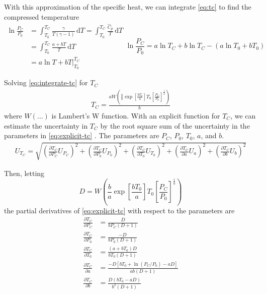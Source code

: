 \documentclass[12pt, letterpaper]{article}
\begin{document}
With this approximation of the specific heat, we can integrate \autoref{eq:tc}
to find the compressed temperature
%
\begin{subequations}
\begin{align}
\ln{\frac{P_C}{P_0}} &= \int_{T_0}^{T_{C}} \! \frac{\gamma}{T\left(\gamma-1\right)} \, \mathrm{d} T
                      = \int_{T_0}^{T_{C}} \! \frac{\hat{C}_p}{T} \, \mathrm{d} T \\
&= \int_{T_0}^{T_{C}} \! \frac{a + b T}{T} \, \mathrm{d} T\\
&= a \ln{T} + b T \Big|_{T_0}^{T_C}
\end{align}
\begin{equation}
\ln{\frac{P_C}{P_0}} = a \ln{T_C} + b \ln{T_C} - \left(a \ln{T_0} + b T_0\right) \label{eq:integrate-tc}
\end{equation}
\end{subequations}

Solving \autoref{eq:integrate-tc} for $T_C$
%
\begin{align}
\label{eq:explicit-tc}
T_C = \frac{a W\!\!\left(\frac{b}{a} \exp\!{\left[\frac{b T_0}{a}\right]} T_0 \left[\frac{P_C}{P_0}\right]^{\frac{1}{a}}\right)}{b}
\end{align}
%
where $W(\ldots)$ is Lambert's W function. With an explicit function for $T_C$, we can
estimate the uncertainty in $T_C$ by the root square sum of the uncertainty in the parameters in
\autoref{eq:explicit-tc} \cite{Taylor1982}. The parameters are $P_C$, $P_0$, $T_0$, $a$, and $b$.
%
\begin{align}
\label{eq:tc-unc}
U_{T_C} = \sqrt{\left(\frac{\partial T_C}{\partial P_C} U_{P_C}\right)^2 + \left(\frac{\partial T_C}{\partial P_0} U_{P_0}\right)^2 +
                \left(\frac{\partial T_C}{\partial T_0} U_{T_0}\right)^2 + \left(\frac{\partial T_C}{\partial a} U_{a}\right)^2 +
                \left(\frac{\partial T_C}{\partial b} U_{b}\right)^2}
\end{align}

Then, letting
%
\begin{equation*}
D = W\!\!\left(\frac{b}{a} \exp\!{\left[\frac{b T_0}{a}\right]} T_0 \left[\frac{P_C}{P_0}\right]^{\frac{1}{a}}\right)
\end{equation*}
%
the partial derivatives of \autoref{eq:explicit-tc} with respect to the parameters are
%
\begin{subequations}
\begin{align}
\frac{\partial T_C}{\partial P_C} &= \frac{D}{b P_C \left(D + 1\right)} \\
\frac{\partial T_C}{\partial P_0} &= \frac{-D}{b P_0 \left(D + 1\right)} \\
\frac{\partial T_C}{\partial T_0} &= \frac{\left(a + b T_0\right) D}{b T_0 \left(D + 1\right)} \\
\frac{\partial T_C}{\partial a} &= \frac{-D \left[b T_0 + \ln{\left(P_C/P_0\right)} - a D\right]}{a b \left(D + 1\right)} \\
\frac{\partial T_C}{\partial b} &= \frac{D\left(b T_0 - a D\right)}{{b}^2\left(D + 1\right)}
\end{align}
\end{subequations}
\end{document}

